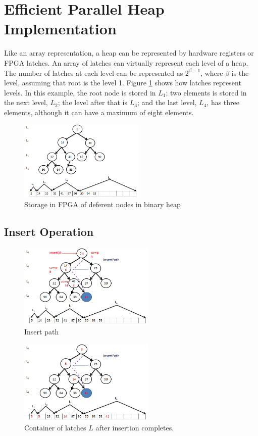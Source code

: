 \documentclass[10pt, conference, compsocconf]{IEEEtran}
\begin{document}
\section{Efficient Parallel Heap Implementation}
Like an array representation, a heap can be represented by hardware registers or FPGA latches.
An array of latches can virtually represent each level of a heap.
The number of latches at each level can be represented as $2^{\beta-1}$, where $\beta$ is the level, assuming that root is the level 1.
Figure \ref{fig5} shows how latches represent levels.
In this example, the root node is stored in $L_1$; two elements is stored in the next level, $L_2$; the level after that is $L_3$; and the last level, $L_4$, has three elements, although it can have a maximum of eight elements.

\begin{figure}[!ht]
  \centering
  \includegraphics[width=6cm]{Figures/5.png}
      \caption{Storage in FPGA of deferent nodes in binary heap}
    \label{fig5}
\end{figure}

\subsection{Insert Operation}
\begin{figure}[!ht]
  \centering
  \includegraphics[width=6.5cm]{Figures/6.png}
      \caption{Insert path}
    \label{fig6}
\end{figure}

\begin{figure}[!ht]
  \centering
  \includegraphics[width=6.5cm]{Figures/7.png}
      \caption{Container of latches $L$ after insertion completes.}
    \label{fig7}
\end{figure}
\end{document}
